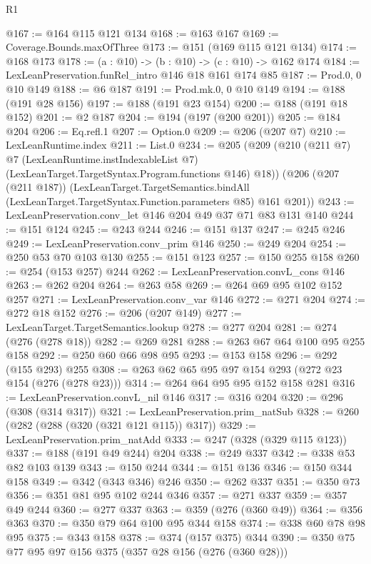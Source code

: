 \begin{lexlean}{R1}
\begin{coremodule}
@167 := @164 @115 @121 @134
@168 := @163 @167
@169 := Coverage.Bounds.maxOfThree
@173 := @151 (@169 @115 @121 @134)
@174 := @168 @173
@178 := (a : @10) -> (b : @10) -> (c : @10) -> @162 @174
@184 := LexLeanPreservation.funRel_intro @146 @18 @161 @174 @85
@187 := Prod.{0, 0} @10 @149
@188 := @6 @187
@191 := Prod.mk.{0, 0} @10 @149
@194 := @188 (@191 @28 @156)
@197 := @188 (@191 @23 @154)
@200 := @188 (@191 @18 @152)
@201 := @2 @187
@204 := @194 (@197 (@200 @201))
@205 := @184 @204
@206 := Eq.refl.{1}
@207 := Option.{0}
@209 := @206 (@207 @7)
@210 := LexLeanRuntime.index
@211 := List.{0}
@234 := @205
    (@209
      (@210
        (@211 @7)
        @7
        (LexLeanRuntime.instIndexableList @7)
        (LexLeanTarget.TargetSyntax.Program.functions @146)
        @18))
    (@206
      (@207 (@211 @187))
      (LexLeanTarget.TargetSemantics.bindAll
        (LexLeanTarget.TargetSyntax.Function.parameters @85)
        @161
        @201))
@243 := LexLeanPreservation.conv_let @146 @204 @49 @37 @71 @83 @131 @140
@244 := @151 @124
@245 := @243 @244
@246 := @151 @137
@247 := @245 @246
@249 := LexLeanPreservation.conv_prim @146
@250 := @249 @204
@254 := @250 @53 @70 @103 @130
@255 := @151 @123
@257 := @150 @255 @158
@260 := @254 (@153 @257) @244
@262 := LexLeanPreservation.convL_cons @146
@263 := @262 @204
@264 := @263 @58
@269 := @264 @69 @95 @102 @152 @257
@271 := LexLeanPreservation.conv_var @146
@272 := @271 @204
@274 := @272 @18 @152
@276 := @206 (@207 @149)
@277 := LexLeanTarget.TargetSemantics.lookup
@278 := @277 @204
@281 := @274 (@276 (@278 @18))
@282 := @269 @281
@288 := @263 @67 @64 @100 @95 @255 @158
@292 := @250 @60 @66 @98 @95
@293 := @153 @158
@296 := @292 (@155 @293) @255
@308 := @263 @62 @65 @95 @97 @154 @293 (@272 @23 @154 (@276 (@278 @23)))
@314 := @264 @64 @95 @95 @152 @158 @281
@316 := LexLeanPreservation.convL_nil @146
@317 := @316 @204
@320 := @296 (@308 (@314 @317))
@321 := LexLeanPreservation.prim_natSub
@328 := @260 (@282 (@288 (@320 (@321 @121 @115)) @317))
@329 := LexLeanPreservation.prim_natAdd
@333 := @247 (@328 (@329 @115 @123))
@337 := @188 (@191 @49 @244) @204
@338 := @249 @337
@342 := @338 @53 @82 @103 @139
@343 := @150 @244
@344 := @151 @136
@346 := @150 @344 @158
@349 := @342 (@343 @346) @246
@350 := @262 @337
@351 := @350 @73
@356 := @351 @81 @95 @102 @244 @346
@357 := @271 @337
@359 := @357 @49 @244
@360 := @277 @337
@363 := @359 (@276 (@360 @49))
@364 := @356 @363
@370 := @350 @79 @64 @100 @95 @344 @158
@374 := @338 @60 @78 @98 @95
@375 := @343 @158
@378 := @374 (@157 @375) @344
@390 := @350 @75 @77 @95 @97 @156 @375 (@357 @28 @156 (@276 (@360 @28)))

\end{coremodule}
\end{lexlean}
